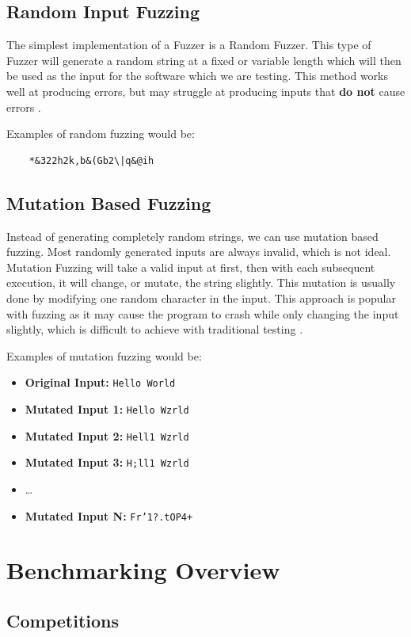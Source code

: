 \documentclass[a4paper,12pt]{article}
\begin{document}
\subsection{Random Input Fuzzing}
The simplest implementation of a Fuzzer is a Random Fuzzer. This type of Fuzzer will generate a random string at a fixed or variable length which will then be used 
as the input for the software which we are testing. This method works well at producing errors, but may struggle at producing inputs that \textbf{do not} cause errors \cite{fuzzingbook2024:Fuzzer:RandomInputs}. 

Examples of random fuzzing would be:
\begin{BVerbatim}
    *&322h2k,b&(Gb2\|q&@ih
\end{BVerbatim}

\subsection{Mutation Based Fuzzing}
Instead of generating completely random strings, we can use mutation based fuzzing. Most randomly generated inputs are always invalid, which is not ideal. 
Mutation Fuzzing will take a valid input at first, then with each subsequent execution, it will change, or mutate, the string slightly. This mutation is usually done 
by modifying one random character in the input. This approach is popular with fuzzing as it may cause the program to crash while only changing the input slightly, 
which is difficult to achieve with traditional testing \cite{fuzzingbook2023:MutationFuzzer}.

Examples of mutation fuzzing would be:
\begin{itemize}
    \item \textbf{Original Input:} \texttt{Hello World}
    \item \textbf{Mutated Input 1:} \texttt{Hello Wzrld}
    \item \textbf{Mutated Input 2:} \texttt{Hell1 Wzrld}
    \item \textbf{Mutated Input 3:} \texttt{H;ll1 Wzrld}
    \item \dots
    \item \textbf{Mutated Input N:} \texttt{Fr'1?.tOP4+}
\end{itemize}

\section{Benchmarking Overview}
\subsection{Competitions}
\end{document}
